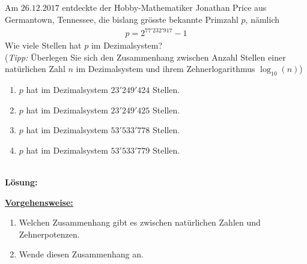 \subsection*{}
Am $ 26.12.2017 $ entdeckte der Hobby-Mathematiker Jonathan Price aus Germantown, Tennessee, die bislang grösste bekannte Primzahl $ p $, nämlich
\begin{align*}
p = 2^{77'232'917} -1
\end{align*}
Wie viele Stellen hat $ p $ im Dezimalsystem?\\
(\textit{Tipp:} Überlegen Sie sich den Zusammenhang zwischen Anzahl Stellen einer natürlichen Zahl $ n $ im Dezimalsystem und ihrem Zehnerlogarithmus $ \log_{10}(n) $) 
\renewcommand{\labelenumi}{(\alph{enumi})}
\begin{enumerate}
	\item 
	$ p $ hat im Dezimalsystem $ 23'249'424 $ Stellen.
	\item
	$ p $ hat im Dezimalsystem $ 23'249'425 $ Stellen.
	\item
	$ p $ hat im Dezimalsystem $ 53'533'778 $ Stellen.
	\item
	$ p $ hat im Dezimalsystem $ 53'533'779 $ Stellen.
\end{enumerate}
\ \\
\textbf{Lösung:}
\begin{mdframed}
\underline{\textbf{Vorgehensweise:}}
\renewcommand{\labelenumi}{\theenumi.}
\begin{enumerate}
\item Welchen Zusammenhang gibt es zwischen natürlichen Zahlen und Zehnerpotenzen.
\item  Wende diesen Zusammenhang an.
\end{enumerate}
\end{mdframed}


